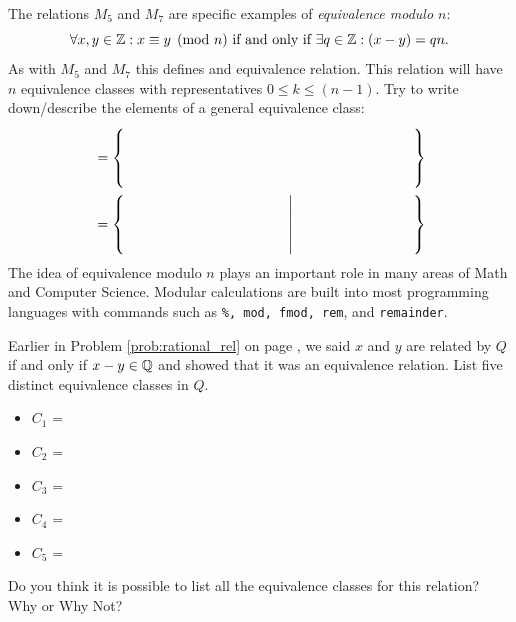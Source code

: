 \begin{practiceprob}
    The relations \(M_5\) and \(M_7\) are specific examples of \emph{equivalence modulo \(n\)}:
    \begin{equation}\label{eq:modequiv}
        \forall x,y\in\bbZ: x\equiv y\pmod{n}\ \text{if and only if}\ \exists q\in\bbZ: (x-y)=qn.
    \end{equation}
    As with \(M_5\) and \(M_7\) this defines and equivalence relation.  This relation will have \(n\) equivalence classes with representatives \(0\leq k\leq (n-1)\).  Try to write down/describe the elements of a general equivalence class:
    \begin{align}
        [k]&=\left\{\phantom{\rule{0.6\textwidth}{25pt}}\right\}\\
            &=\left\{\phantom{\rule{0.34\textwidth}{25pt}}\middle|\phantom{\rule{0.25\textwidth}{15pt}}\right\}
    \end{align}
    The idea of equivalence modulo \(n\) plays an important role in many areas of Math and Computer Science. Modular calculations are built into most programming languages with commands such as \verb|%, mod, fmod, rem|, and  \verb|remainder|.
\end{practiceprob}

\clearpage

\begin{practiceprob}
    Earlier in Problem \ref{prob:rational_rel} on page \pageref{prob:rational_rel}, we said \(x\) and \(y\) are related by \(Q\) if and only if \(x-y\in\mbox{$\mathbb{Q}$}\) and showed that it was an equivalence relation.  List five distinct equivalence classes in \(Q\).
    \begin{itemize}
        \item \(C_1\) = \vspace{2\baselineskip}
        \item \(C_2\) = \vspace{2\baselineskip}
        \item \(C_3\) = \vspace{2\baselineskip}
        \item \(C_4\) = \vspace{2\baselineskip}
        \item \(C_5\) = \vspace{2\baselineskip}
    \end{itemize}
    Do you think it is possible to list all the equivalence classes for this relation? Why or Why Not?
    \vspace{10\baselineskip}
\end{practiceprob}

